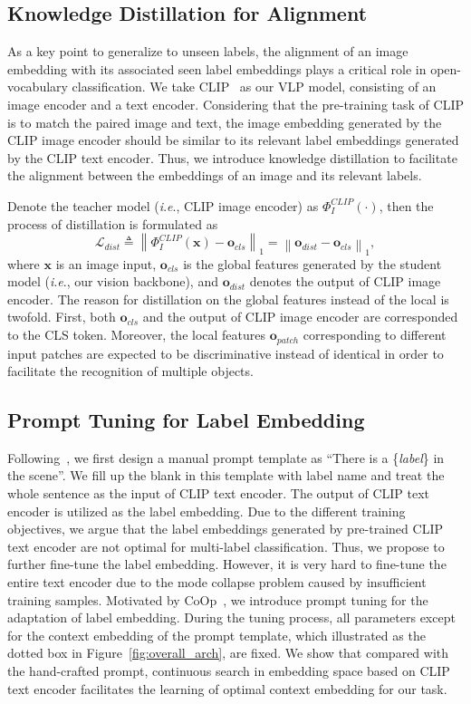 \documentclass[letterpaper]{article} %
\newcommand{\ie}{\textit{i}.\textit{e}.}
\begin{document}
\subsection{Knowledge Distillation for Alignment}
As a key point to generalize to unseen labels, the alignment of an image embedding with its associated seen label embeddings plays a critical role in open-vocabulary classification.
We take CLIP~\cite{clip} as our VLP model, consisting of an image encoder and a text encoder.
Considering that the pre-training task of CLIP is to match the paired image and text, the image embedding generated by the CLIP image encoder should be similar to its relevant label embeddings generated by the CLIP text encoder.
Thus, we introduce knowledge distillation to facilitate the alignment between the embeddings of an image and its relevant labels.

Denote the teacher model (\ie, CLIP image encoder) as $\Phi_{I}^{CLIP}\left(\cdot\right)$, then the process of distillation is formulated as
\begin{equation}
\mathcal{L}_{dist} \triangleq \left\| \Phi_{I}^{CLIP}\left(\mathbf{x}\right) - \mathbf{o}_{cls} \right\|_{1} = \left\| \mathbf{o}_{dist} - \mathbf{o}_{cls} \right\|_{1},
\end{equation}
where $\mathbf{x}$ is an image input, $\mathbf{o}_{cls}$ is the global features generated by the student model (\ie, our vision backbone), and $\mathbf{o}_{dist}$ denotes the output of CLIP image encoder.
The reason for distillation on the global features instead of the local is twofold.
First, both $\mathbf{o}_{cls}$ and the output of CLIP image encoder are corresponded to the CLS token.
Moreover, the local features $\mathbf{o}_{patch}$ corresponding to different input patches are expected to be discriminative instead of identical in order to facilitate the recognition of multiple objects.



\subsection{Prompt Tuning for Label Embedding}
Following~\cite{clip}, we first design a manual prompt template as ``There is a \{\textit{label}\} in the scene''.
We fill up the blank in this template with label name and treat the whole sentence as the input of CLIP text encoder.
The output of CLIP text encoder is utilized as the label embedding.
Due to the different training objectives, we argue that the label embeddings generated by pre-trained CLIP text encoder are not optimal for multi-label classification.
Thus, we propose to further fine-tune the label embedding.
However, it is very hard to fine-tune the entire text encoder due to the mode collapse problem caused by insufficient training samples.
Motivated by CoOp~\cite{coop}, we introduce prompt tuning for the adaptation of label embedding.
During the tuning process, all parameters except for the context embedding of the prompt template, which illustrated as the dotted box in Figure~\ref{fig:overall_arch}, are fixed.
We show that compared with the hand-crafted prompt, continuous search in embedding space based on CLIP text encoder facilitates the learning of optimal context embedding for our task.
\end{document}
